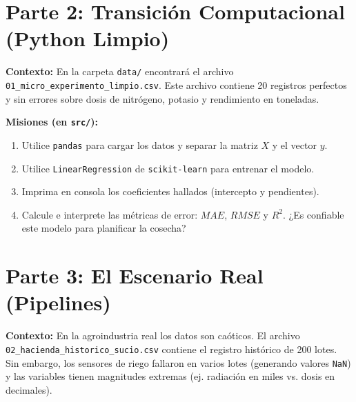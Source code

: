 \documentclass[12pt,a4paper]{article}
\begin{document}
\vspace{1cm}



\section{Parte 2: Transición Computacional (Python Limpio)}

\textbf{Contexto:} En la carpeta \texttt{data/} encontrará el archivo \texttt{01\_micro\_experimento\_limpio.csv}. Este archivo contiene 20 registros perfectos y sin errores sobre dosis de nitrógeno, potasio y rendimiento en toneladas.

\textbf{Misiones (en \texttt{src/}):}
\begin{enumerate}[label=\alph*)]
    \item Utilice \texttt{pandas} para cargar los datos y separar la matriz $X$ y el vector $y$.
    \item Utilice \texttt{LinearRegression} de \texttt{scikit-learn} para entrenar el modelo.
    \item Imprima en consola los coeficientes hallados (intercepto y pendientes).
    \item Calcule e interprete las métricas de error: $MAE$, $RMSE$ y $R^2$. ¿Es confiable este modelo para planificar la cosecha?
\end{enumerate}

\vspace{1cm}

\section{Parte 3: El Escenario Real (Pipelines)}

\textbf{Contexto:} En la agroindustria real los datos son caóticos. El archivo \texttt{02\_hacienda\_historico\_sucio.csv} contiene el registro histórico de 200 lotes. Sin embargo, los sensores de riego fallaron en varios lotes (generando valores \texttt{NaN}) y las variables tienen magnitudes extremas (ej. radiación en miles vs. dosis en decimales).
\end{document}
